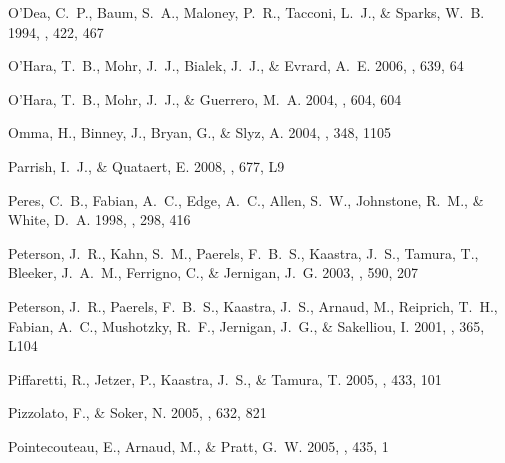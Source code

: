 \documentclass[12pt,preprint]{aastex}
\begin{document}
\begin{thebibliography}{138}
{O'Dea}, C.~P., {Baum}, S.~A., {Maloney}, P.~R., {Tacconi}, L.~J., \& {Sparks},
  W.~B. 1994, \apj, 422, 467

{O'Hara}, T.~B., {Mohr}, J.~J., {Bialek}, J.~J., \& {Evrard}, A.~E. 2006, \apj,
  639, 64

{O'Hara}, T.~B., {Mohr}, J.~J., \& {Guerrero}, M.~A. 2004, \apj, 604, 604

{Omma}, H., {Binney}, J., {Bryan}, G., \& {Slyz}, A. 2004, \mnras, 348, 1105

{Parrish}, I.~J., \& {Quataert}, E. 2008, \apjl, 677, L9

{Peres}, C.~B., {Fabian}, A.~C., {Edge}, A.~C., {Allen}, S.~W., {Johnstone},
  R.~M., \& {White}, D.~A. 1998, \mnras, 298, 416

{Peterson}, J.~R., {Kahn}, S.~M., {Paerels}, F.~B.~S., {Kaastra}, J.~S.,
  {Tamura}, T., {Bleeker}, J.~A.~M., {Ferrigno}, C., \& {Jernigan}, J.~G. 2003,
  \apj, 590, 207

{Peterson}, J.~R., {Paerels}, F.~B.~S., {Kaastra}, J.~S., {Arnaud}, M.,
  {Reiprich}, T.~H., {Fabian}, A.~C., {Mushotzky}, R.~F., {Jernigan}, J.~G., \&
  {Sakelliou}, I. 2001, \aap, 365, L104

{Piffaretti}, R., {Jetzer}, P., {Kaastra}, J.~S., \& {Tamura}, T. 2005, \aap,
  433, 101

{Pizzolato}, F., \& {Soker}, N. 2005, \apj, 632, 821

{Pointecouteau}, E., {Arnaud}, M., \& {Pratt}, G.~W. 2005, \aap, 435, 1


\end{thebibliography}
\end{document}
